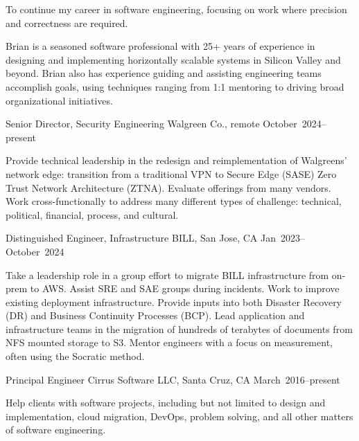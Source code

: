 \documentclass{resume}
\begin{document}
\begin{resume}
\begin{Objective}
To continue my career in software engineering, focusing on work where precision and correctness are required. 
\end{Objective}

\begin{Profile}
Brian is a seasoned software professional with 25+ years of experience
in designing and implementing horizontally scalable systems in Silicon
Valley and beyond. Brian also has experience guiding and assisting
engineering teams accomplish goals, using techniques ranging from 1:1
mentoring to driving broad organizational initiatives.
\end{Profile}

\begin{Employment}
\begin{job}{Senior Director, Security Engineering}
           {Walgreen Co., remote }
           {October~2024--present}

Provide technical leadership in the redesign and reimplementation of
Walgreens' network edge: transition from a traditional VPN to Secure
Edge (SASE) Zero Trust Network Architecture (ZTNA). Evaluate offerings
from many vendors. Work cross-functionally to address many different
types of challenge: technical, political, financial, process, and
cultural.
           
\end{job}

\begin{job}{Distinguished Engineer, Infrastructure}
           {BILL, San Jose, CA}
           {Jan~2023--October~2024}

Take a leadership role in a group effort to migrate BILL
infrastructure from on-prem to AWS. Assist SRE and SAE groups during
incidents. Work to improve existing deployment infrastructure. Provide
inputs into both Disaster Recovery (DR) and Business Continuity
Processes (BCP). Lead application and infrastructure teams in the
migration of hundreds of terabytes of documents from NFS mounted
storage to S3. Mentor engineers with a focus on measurement, often
using the Socratic method.

\end{job}

\begin{job}{Principal Engineer}
           {Cirrus Software LLC, Santa Cruz, CA}
           {March~2016--present}

Help clients with software projects, including but not limited to design and implementation, cloud migration, DevOps, problem solving, and all other matters of software engineering.


\end{job}
\end{Employment}
\end{resume}
\end{document}
